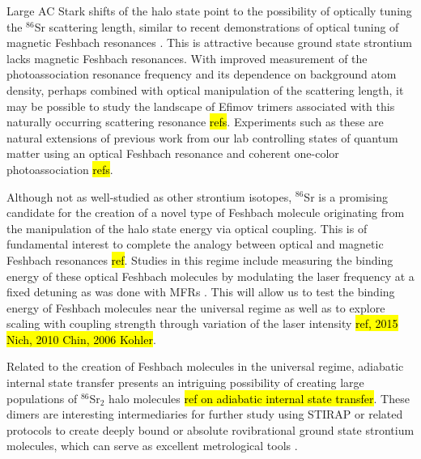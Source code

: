 Large AC Stark shifts of the halo state point to the possibility of optically tuning the $^{86}$Sr scattering length, similar to recent demonstrations of optical tuning of magnetic Feshbach resonances \hl{\cite{blv09,chx15}}. 
This is attractive because ground state strontium lacks magnetic Feshbach resonances.
With improved measurement of the photoassociation resonance frequency and its dependence on background atom density, perhaps combined with optical manipulation of the scattering length, it may be possible to study the landscape of Efimov trimers associated with this naturally occurring scattering resonance \hl{refs}.
Experiments such as these are natural extensions of previous work from our lab controlling states of quantum matter using an optical Feshbach resonance and coherent one-color photoassociation \hl{refs}.

\cite{Kim2016}
\cite{Franchi2017}

Although not as well-studied as other strontium isotopes, $^{86}$Sr is a promising candidate for the creation of a novel type of Feshbach molecule originating from the manipulation of the halo state energy via optical coupling.
This is of fundamental interest to complete the analogy between optical and magnetic Feshbach resonances \hl{ref}.
Studies in this regime include measuring the binding energy of these optical Feshbach molecules by modulating the laser frequency at a fixed detuning as was done with MFRs \hl{\cite{Stoferle2006,Thompson2005a}}. 
This will allow us to test the binding energy of Feshbach molecules near the universal regime as well as to explore scaling with coupling strength through variation of the laser intensity \hl{ref, 2015 Nich, 2010 Chin, 2006 Kohler}.

Related to the creation of Feshbach molecules in the universal regime, adiabatic internal state transfer presents an intriguing possibility of creating large populations of $^{86}$Sr$_2$ halo molecules \hl{ref on adiabatic internal state transfer}.
These dimers are interesting intermediaries for further study using STIRAP or related protocols to create deeply bound or absolute rovibrational ground state strontium molecules, which can serve as excellent metrological tools \hl{\cite{Durr2004, Skomorowski2012, Zelevinsky2008, Stellmer2012, Reinaudi2012}}.

